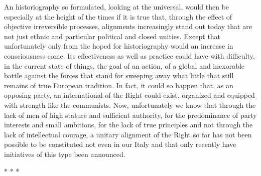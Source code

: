 An historiography so formulated, looking at the universal, would then be especially at the height of the times if it is true that, through the effect of objective irreversible processes, alignments increasingly stand out today that are not just ethnic and particular political and closed unities. Except that unfortunately only from the hoped for historiography would an increase in consciousness come. Its effectiveness as well as practice could have with difficulty, in the current state of things, the goal of an action, of a global and inexorable battle against the forces that stand for sweeping away what little that still remains of true European tradition. In fact, it could so happen that, as an opposing party, an international of the Right could exist, organized and equipped with strength like the communists. Now, unfortunately we know that through the lack of men of high stature and sufficient authority, for the predominance of party interests and small ambitions, for the lack of true principles and not through the lack of intellectual courage, a unitary alignment of the Right so far has not been possible to be constituted not even in our Italy and that only recently have initiatives of this type been announced.



\begin{center}* * *\end{center}


